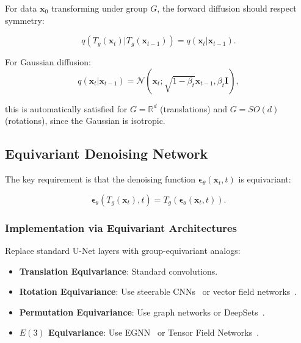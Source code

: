 \documentclass[12pt]{report}
\theoremstyle{definition}
\newcommand{\R}{\mathbb{R}}
\newcommand{\N}{\mathcal{N}}
\begin{document}
For data $\mathbf{x}_0$ transforming under group $G$, the forward diffusion should respect symmetry:

\begin{equation}
q(T_g(\mathbf{x}_t) | T_g(\mathbf{x}_{t-1})) = q(\mathbf{x}_t | \mathbf{x}_{t-1}).
\label{eq:equivariant_forward}
\end{equation}

For Gaussian diffusion:
\begin{equation}
q(\mathbf{x}_t | \mathbf{x}_{t-1}) = \N(\mathbf{x}_t; \sqrt{1-\beta_t}\mathbf{x}_{t-1}, \beta_t\mathbf{I}),
\label{eq:gaussian_forward_symmetric}
\end{equation}

this is automatically satisfied for $G = \R^d$ (translations) and $G = SO(d)$ (rotations), since the Gaussian is isotropic.

\subsection{Equivariant Denoising Network}

The key requirement is that the denoising function $\boldsymbol{\epsilon}_\theta(\mathbf{x}_t, t)$ is equivariant:

\begin{equation}
\boldsymbol{\epsilon}_\theta(T_g(\mathbf{x}_t), t) = T_g(\boldsymbol{\epsilon}_\theta(\mathbf{x}_t, t)).
\label{eq:equivariant_denoiser}
\end{equation}

\subsubsection{Implementation via Equivariant Architectures}

Replace standard U-Net layers with group-equivariant analogs:

\begin{itemize}
\item \textbf{Translation Equivariance}: Standard convolutions.
\item \textbf{Rotation Equivariance}: Use steerable CNNs~\citep{weiler2018learning} or vector field networks~\citep{cohen2016group}.
\item \textbf{Permutation Equivariance}: Use graph networks or DeepSets~\citep{zaheer2017deep}.
\item \textbf{$E(3)$ Equivariance}: Use EGNN~\citep{satorras2021n} or Tensor Field Networks~\citep{thomas2018tensor}.
\end{itemize}
\end{document}
